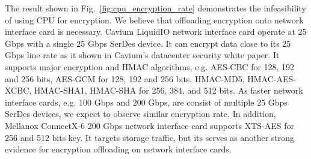 The result shown in Fig.~\ref{fig:cpu_encryption_rate} demonstrates the infeasibility of using CPU for encryption. We believe that offloading encryption onto network interface card is necessary. Cavium LiquidIO network interface card operate at 25 Gbps with a single 25 Gbps SerDes device. It can encrypt data close to its 25 Gbps line rate as it shown in Cavium's datacenter security white paper. It supports major encryption and HMAC algorithms, e.g. AES-CBC for 128, 192 and 256 bits, AES-GCM for 128, 192 and 256 bits, HMAC-MD5, HMAC-AES-XCBC, HMAC-SHA1, HMAC-SHA for 256, 384, and 512 bits. As faster network interface cards, e.g. 100 Gbps and 200 Gbps, are consist of multiple 25 Gbps SerDes devices, we expect to observe similar encryption rate. In addition, Mellanox ConnectX-6 200 Gbps network interface card supports XTS-AES for 256 and 512 bits key. It targets storage traffic, but its serves as another strong evidence for encryption offloading on network interface cards.
